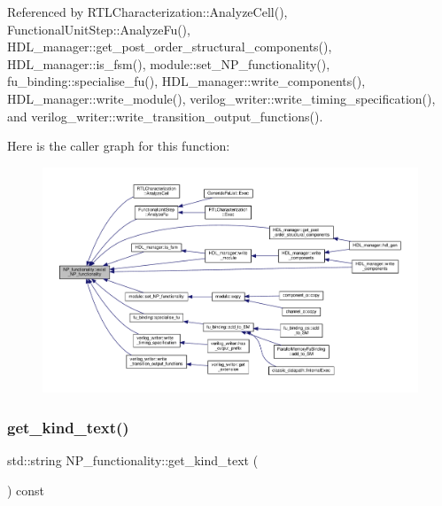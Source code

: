 Referenced by R\+T\+L\+Characterization\+::\+Analyze\+Cell(), Functional\+Unit\+Step\+::\+Analyze\+Fu(), H\+D\+L\+\_\+manager\+::get\+\_\+post\+\_\+order\+\_\+structural\+\_\+components(), H\+D\+L\+\_\+manager\+::is\+\_\+fsm(), module\+::set\+\_\+\+N\+P\+\_\+functionality(), fu\+\_\+binding\+::specialise\+\_\+fu(), H\+D\+L\+\_\+manager\+::write\+\_\+components(), H\+D\+L\+\_\+manager\+::write\+\_\+module(), verilog\+\_\+writer\+::write\+\_\+timing\+\_\+specification(), and verilog\+\_\+writer\+::write\+\_\+transition\+\_\+output\+\_\+functions().

Here is the caller graph for this function\+:
\nopagebreak
\begin{figure}[H]
\begin{center}
\leavevmode
\includegraphics[width=350pt]{d8/dda/classNP__functionality_a3aff579cc53f4ecc42e7cd5b1c790142_icgraph}
\end{center}
\end{figure}
\mbox{\label{classNP__functionality_abb6480b8bf9edc6a6f1aaaf7781029ae}} 
\subsubsection{\texorpdfstring{get\+\_\+kind\+\_\+text()}{get\_kind\_text()}}
{\footnotesize\ttfamily std\+::string N\+P\+\_\+functionality\+::get\+\_\+kind\+\_\+text (\begin{DoxyParamCaption}{ }\end{DoxyParamCaption}) const\hspace{0.3cm}{\ttfamily [inline]}}




